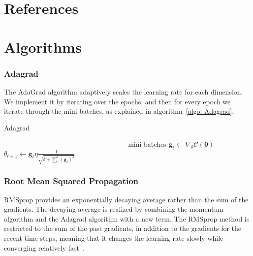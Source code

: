 \documentclass[english,notitlepage,reprint,nofootinbib]{revtex4-2}  %
\begin{document}

\newpage 
\section*{References}
\printbibliography[heading=none]

\appendix
\section{Algorithms}\label{app: algos}
\subsubsection*{Adagrad} %
The AdaGrad algorithm adaptively scales the learning rate for each dimension. We implement it by iterating over the epochs, and then for every epoch we iterate through the mini-batches, as explained in algorithm~\ref{algo: Adagrad}. %

\begin{algorithm}[H]
    \caption{Adagrad}\label{algo: Adagrad}
    \begin{algorithmic}
         
        \State $\:\:\:\:\:\:\:\:\:\:\:\:\:\:\:\:\:\:\:\:\:\:\:\:\:\:\:\:\:\:\:\:\:\:\:\:\:\:\:\:\:\:\:\:\:\:\:\:\:\:\:\:\:\:\:\:\:\:\:\:\:\:\:\:\:\:\:\:\:\:\:\:\:\:\:\:\:\:\:\:$ mini-batches
        \State $\mathbf{g}_t \leftarrow \nabla_\theta \mathcal{C}(\boldsymbol{\theta})$ 
        \State $\theta_{t+1} \leftarrow \mathbf{g}_t \eta \frac{1}{\sqrt{\delta+ \sum^t(\mathbf{g}_t)^2}}$
    \end{algorithmic}
\end{algorithm}

\subsubsection*{Root Mean Squared Propagation}
RMSprop provides an exponentially decaying average rather than the sum of the gradients. The decaying average is realized by combining the momentum algorithm and the Adagrad algorithm with a new term. The RMSprop method is restricted to the sum of the past gradients, in addition to the gradients for the recent time steps, meaning that it changes the learning rate slowly while converging relatively fast~\cite{lecture_notes}. 
\end{document}
